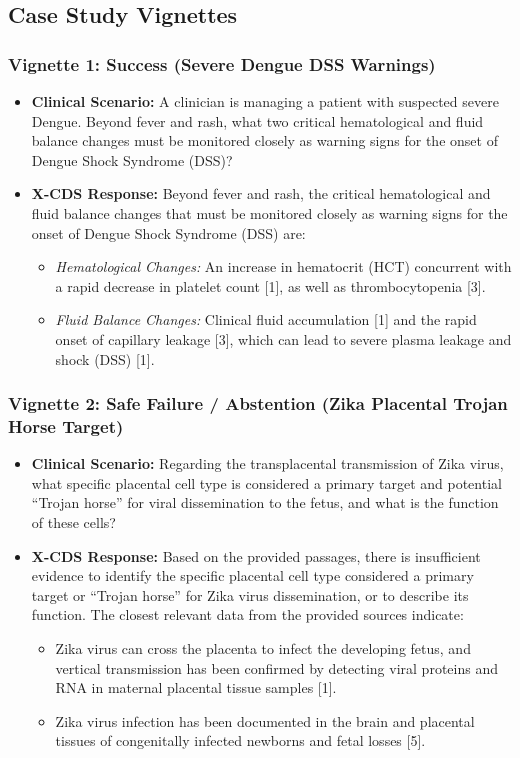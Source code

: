 \documentclass[sn-mathphys,Numbered]{sn-jnl}%
\begin{document}
\subsection{Case Study Vignettes}

\subsubsection{Vignette 1: Success (Severe Dengue DSS Warnings)}
\begin{itemize}
    \item \textbf{Clinical Scenario:} A clinician is managing a patient with suspected severe Dengue. Beyond fever and rash, what two critical hematological and fluid balance changes must be monitored closely as warning signs for the onset of Dengue Shock Syndrome (DSS)?
    \item \textbf{X-CDS Response:} Beyond fever and rash, the critical hematological and fluid balance changes that must be monitored closely as warning signs for the onset of Dengue Shock Syndrome (DSS) are:
    \begin{itemize}
        \item \emph{Hematological Changes:} An increase in hematocrit (HCT) concurrent with a rapid decrease in platelet count [1], as well as thrombocytopenia [3].
        \item \emph{Fluid Balance Changes:} Clinical fluid accumulation [1] and the rapid onset of capillary leakage [3], which can lead to severe plasma leakage and shock (DSS) [1].
    \end{itemize}
\end{itemize}

\subsubsection{Vignette 2: Safe Failure / Abstention (Zika Placental Trojan Horse Target)}
\begin{itemize}
    \item \textbf{Clinical Scenario:} Regarding the transplacental transmission of Zika virus, what specific placental cell type is considered a primary target and potential ``Trojan horse'' for viral dissemination to the fetus, and what is the function of these cells?
    \item \textbf{X-CDS Response:} Based on the provided passages, there is insufficient evidence to identify the specific placental cell type considered a primary target or ``Trojan horse'' for Zika virus dissemination, or to describe its function. The closest relevant data from the provided sources indicate:
    \begin{itemize}
        \item Zika virus can cross the placenta to infect the developing fetus, and vertical transmission has been confirmed by detecting viral proteins and RNA in maternal placental tissue samples [1].
        \item Zika virus infection has been documented in the brain and placental tissues of congenitally infected newborns and fetal losses [5].
    \end{itemize}
\end{itemize}
\end{document}
